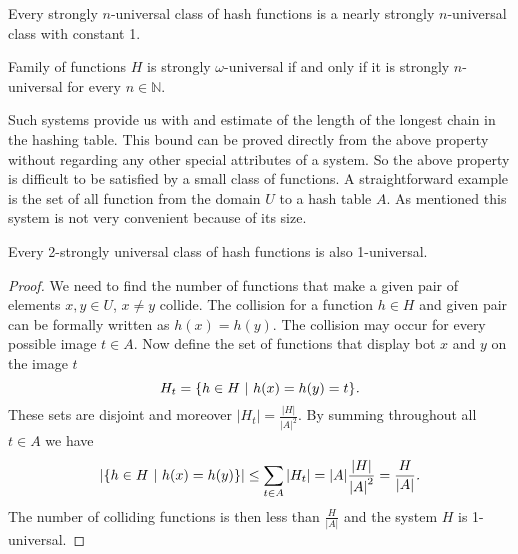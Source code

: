 Every strongly $n$-universal class of hash functions is a nearly strongly $n$-universal class with constant 1.

\begin{definition}
\label{strong_universal_omega_system}
Family of functions $H$ is strongly $\omega$-universal if and only if it is strongly $n$-universal for every $n \in \mathbb{N}$.
\end{definition}

Such systems provide us with and estimate of the length of the longest chain in the hashing table. This bound can be proved directly from the above property without regarding any other special attributes of a system. So the above property is difficult to be satisfied by a small class of functions. A straightforward example is the set of all function from the domain $U$ to a hash table $A$. As mentioned this system is not very convenient because of its size.

\begin{remark}
Every 2-strongly universal class of hash functions is also 1-universal.
\end{remark}
\begin{proof}
We need to find the number of functions that make a given pair of elements $x, y \in U$, $x \neq y$ collide. The collision for a function $h \in H$ and given pair can be formally written as $h(x) = h(y)$. The collision may occur for every possible image $t \in A$. Now define the set of functions that display bot $x$ and $y$ on the image $t$ \[ H_t = \lbrace h \in H \ | \  h(x) = h(y) = t \rbrace \textit{.} \] These sets are disjoint and moreover $|H_t| = \frac{|H|}{{|A|}^{2}}$. By summing throughout all $t \in A$ we have
\begin{displaymath}
|\lbrace h \in H \ | \  h(x) = h(y) \rbrace | \leq \displaystyle \sum_{t \in A} |H_t| = |A| \frac{|H|}{{|A|}^{2}} = \frac{H}{|A|}\textit{.}
\end{displaymath}
The number of colliding functions is then less than $\frac{H}{|A|}$ and the system $H$ is 1-universal.
\end{proof}

